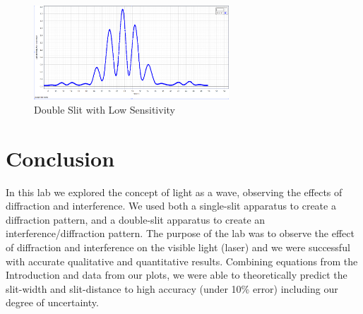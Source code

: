 \documentclass{article}[12pt]
\begin{document}
\begin{figure}
  \center
  \includegraphics[width=0.65\textwidth]{figures/double_low.PNG}
  \caption{Double Slit with Low Sensitivity}
\end{figure}

\section{Conclusion}

In this lab we explored the concept of light as a wave, observing the effects of diffraction and interference. 
We used both a single-slit apparatus to create a diffraction pattern, and a double-slit apparatus to create an interference/diffraction pattern.
The purpose of the lab was to observe the effect of diffraction and interference on the visible light (laser) and we were successful with accurate qualitative and quantitative results.
Combining equations from the Introduction and data from our plots, we were able to theoretically predict the slit-width and slit-distance to high accuracy (under 10\% error) including our degree of uncertainty.



\end{document}
